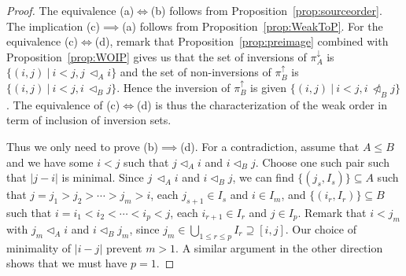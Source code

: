 \documentclass[reqno]{amsart}
\theoremstyle{definition}
\newcommand{\less}{\vartriangleleft} %
\newcommand{\projDown}{\pi^\downarrow} %
\newcommand{\projUp}{\pi^\uparrow} %
\begin{document}
\begin{proof} The equivalence (a)$\iff$(b) follows from Proposition~\ref{prop:sourceorder}. The implication (c)$\implies$(a) follows from  Proposition~\ref{prop:WeakToP}.
For the equivalence (c)$\iff$(d), remark that Proposition~\ref{prop:preimage} combined with Proposition~\ref{prop:WOIP} gives us that the set of inversions of $\projDown_A$
is $\big\{(i,j)\ |\  i<j, j\,\less_Ai \big\}$ and the set of non-inversions of $\projUp_B$ is  $\big\{(i,j)\ |\  i<j, i\,\less_B j \big\}$. Hence the inversion of $\projUp_B$ is  given $\big\{(i,j)\ |\  i<j, i\,\not\less_B j \big\}$.
The equivalence of (c)$\iff$(d) is thus the characterization of the weak order in term of inclusion of inversion sets.

Thus we only need to prove (b)$\implies$(d). For a contradiction, assume that $A\le B$ and we have some $i<j$ such that $j\less_Ai$ and  $i \less_B j$. Choose one such pair such that $|j-i|$ is minimal.
Since $j\,\less_A i$ and $i \less_B j$, we can find
$\{(j_s,I_{s})\}\subseteq A$ such that $j=j_1>j_2>\cdots>j_m>i$, each $j_{s+1}\in I_s$ and $i\in I_m$, and 
$\{(i_r,I_{r})\}\subseteq B$ such that $i=i_1<i_2<\cdots<i_p<j$, each $i_{r+1}\in I_r$ and $j\in I_p$. Remark that $i<j_m$ with $j_m\less_A i$ and $i\less_B j_m$, since $j_m\in \bigcup_{1\le r\le p}I_r\supseteq [i,j]$.
Our choice of minimality of $|i-j|$ prevent $m>1$. A similar argument in the other direction shows that we must have $p=1$. 


\end{proof}
\end{document}
